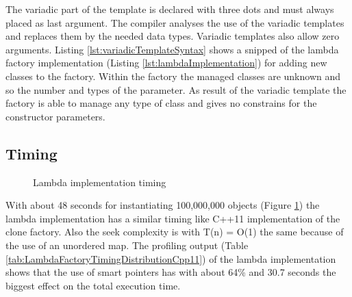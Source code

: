 {

\noindent The variadic part of the template is declared with three dots and must always placed as last argument. The compiler analyses the use of the variadic templates and replaces them by the needed data types. Variadic templates also allow zero arguments. Listing \ref{lst:variadicTemplateSyntax} shows a snipped of the lambda factory implementation (Listing \ref{lst:lambdaImplementation}) for adding new classes to the factory. Within the factory the managed classes are unknown and so the number and types of the parameter. As result of the variadic template the factory is able to manage any type of class and gives no constrains for the constructor parameters.

\newpage

\subsection{Timing}\label{sec:timingLambdaFactory}

\begin{figure}[h]{}
\centering
\mbox{}
\caption{Lambda implementation timing}
\label{fig:lambdaImplementationTiming}
\end{figure}

\noindent With about 48 seconds for instantiating 100,000,000 objects (Figure \ref{fig:lambdaImplementationTiming}) the lambda implementation has a similar timing like C++11 implementation of the clone factory. Also the seek complexity is with T(n) = O(1) the same because of the use of an unordered map. The profiling output (Table \ref{tab:LambdaFactoryTimingDistributionCpp11}) of the lambda implementation shows that the use of smart pointers has with about 64\% and 30.7 seconds the biggest effect on the total execution time.

}

